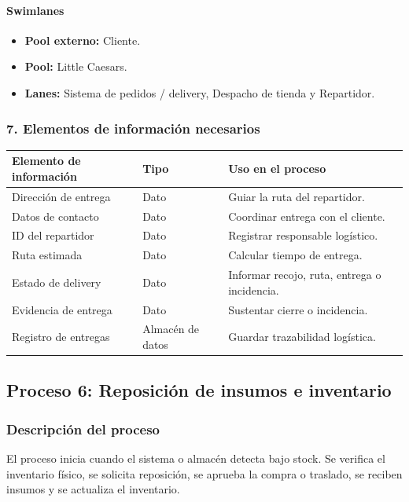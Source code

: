 \documentclass[a4paper,12pt]{article}
\begin{document}
\paragraph{Swimlanes}

\begin{itemize}
    \item \textbf{Pool externo:} Cliente.
    \item \textbf{Pool:} Little Caesars.
    \item \textbf{Lanes:} Sistema de pedidos / delivery, Despacho de tienda y Repartidor.
\end{itemize}

\subsubsection*{7. Elementos de información necesarios}

\begin{longtable}{P{5cm} P{5cm} P{4cm}}
\toprule
\textbf{Elemento de información} & \textbf{Tipo} & \textbf{Uso en el proceso} \\
\midrule
Dirección de entrega & Dato & Guiar la ruta del repartidor. \\
Datos de contacto & Dato & Coordinar entrega con el cliente. \\
ID del repartidor & Dato & Registrar responsable logístico. \\
Ruta estimada & Dato & Calcular tiempo de entrega. \\
Estado de delivery & Dato & Informar recojo, ruta, entrega o incidencia. \\
Evidencia de entrega & Dato & Sustentar cierre o incidencia. \\
Registro de entregas & Almacén de datos & Guardar trazabilidad logística. \\
\bottomrule
\end{longtable}

\subsection*{Proceso 6: Reposición de insumos e inventario}

\subsubsection*{Descripción del proceso}

El proceso inicia cuando el sistema o almacén detecta bajo stock. Se verifica el inventario físico, se solicita reposición, se aprueba la compra o traslado, se reciben insumos y se actualiza el inventario.
\end{document}
